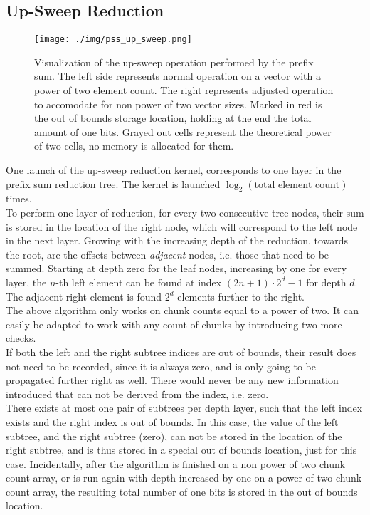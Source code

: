 \documentclass{tudscrreprt}
\begin{document}
			\subsection{Up-Sweep Reduction}
				\begin{figure}[!ht]
					\centering
					\texttt{[image: ./img/pss\_up\_sweep.png]}
					\caption{\label{fig:pss_up_sweep}Visualization of the up-sweep operation performed by the prefix sum. The left side represents normal operation on a vector with a power of two element count. The right represents adjusted operation to accomodate for non power of two vector sizes. Marked in red is the out of bounds storage location, holding at the end the total amount of one bits. Grayed out cells represent the theoretical power of two cells, no memory is allocated for them.}
				\end{figure}
				One launch of the up-sweep reduction kernel, corresponds to one layer in the prefix sum reduction tree. The kernel is launched $\log_2(\text{total element count})$ times. \\
				To perform one layer of reduction, for every two consecutive tree nodes, their sum is stored in the location of the right node, which will correspond to the left node in the next layer. Growing with the increasing depth of the reduction, towards the root, are the offsets between \emph{adjacent} nodes, i.e. those that need to be summed. Starting at depth zero for the leaf nodes, increasing by one for every layer, the $n$-th left element can be found at index $(2n+1) \cdot 2^d -1$ for depth $d$. The adjacent right element is found $2^d$ elements further to the right. \\
				
				The above algorithm only works on chunk counts equal to a power of two. It can easily be adapted to work with any count of chunks by introducing two more checks. \\
				If both the left and the right subtree indices are out of bounds, their result does not need to be recorded, since it is always zero, and is only going to be propagated further right as well. There would never be any new information introduced that can not be derived from the index, i.e. zero. \\
				There exists at most one pair of subtrees per depth layer, such that the left index exists and the right index is out of bounds. In this case, the value of the left subtree, and the right subtree (zero), can not be stored in the location of the right subtree, and is thus stored in a special out of bounds location, just for this case. Incidentally, after the algorithm is finished on a non power of two chunk count array, or is run again with depth increased by one on a power of two chunk count array, the resulting total number of one bits is stored in the out of bounds location. \\
			
\end{document}
